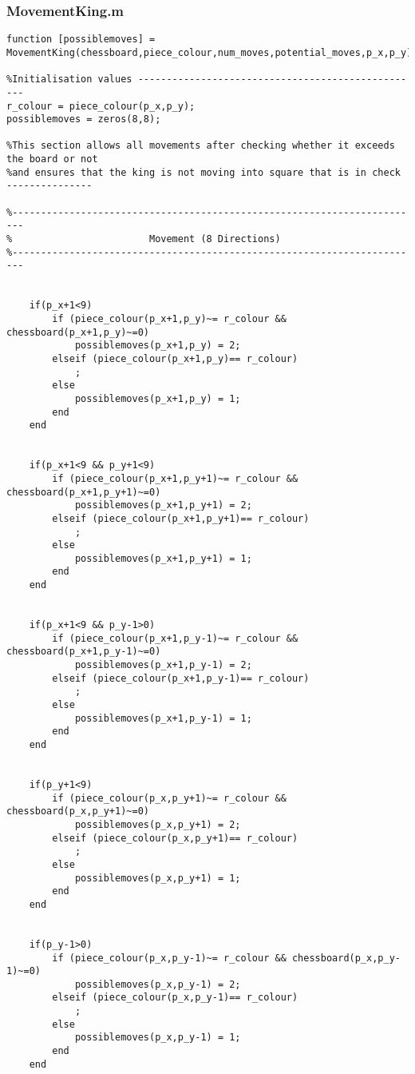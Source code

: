 \documentclass{article}
\begin{document}
\subsubsection{MovementKing.m}
\begin{lstlisting}
function [possiblemoves] = MovementKing(chessboard,piece_colour,num_moves,potential_moves,p_x,p_y)

%Initialisation values --------------------------------------------------
r_colour = piece_colour(p_x,p_y);
possiblemoves = zeros(8,8);

%This section allows all movements after checking whether it exceeds the board or not 
%and ensures that the king is not moving into square that is in check ---------------

%------------------------------------------------------------------------
%                        Movement (8 Directions)
%------------------------------------------------------------------------

    
    if(p_x+1<9)
        if (piece_colour(p_x+1,p_y)~= r_colour && chessboard(p_x+1,p_y)~=0)
            possiblemoves(p_x+1,p_y) = 2;
        elseif (piece_colour(p_x+1,p_y)== r_colour)
            ;
        else
            possiblemoves(p_x+1,p_y) = 1;
        end
    end
    
    
    if(p_x+1<9 && p_y+1<9)
        if (piece_colour(p_x+1,p_y+1)~= r_colour && chessboard(p_x+1,p_y+1)~=0)
            possiblemoves(p_x+1,p_y+1) = 2;
        elseif (piece_colour(p_x+1,p_y+1)== r_colour)
            ;
        else
            possiblemoves(p_x+1,p_y+1) = 1;
        end
    end
    
    
    if(p_x+1<9 && p_y-1>0)
        if (piece_colour(p_x+1,p_y-1)~= r_colour && chessboard(p_x+1,p_y-1)~=0)
            possiblemoves(p_x+1,p_y-1) = 2;
        elseif (piece_colour(p_x+1,p_y-1)== r_colour)
            ;
        else
            possiblemoves(p_x+1,p_y-1) = 1;
        end
    end
    
    
    if(p_y+1<9)
        if (piece_colour(p_x,p_y+1)~= r_colour && chessboard(p_x,p_y+1)~=0)
            possiblemoves(p_x,p_y+1) = 2;
        elseif (piece_colour(p_x,p_y+1)== r_colour)
            ;
        else
            possiblemoves(p_x,p_y+1) = 1;
        end
    end
    
    
    if(p_y-1>0)
        if (piece_colour(p_x,p_y-1)~= r_colour && chessboard(p_x,p_y-1)~=0)
            possiblemoves(p_x,p_y-1) = 2;
        elseif (piece_colour(p_x,p_y-1)== r_colour)
            ;
        else
            possiblemoves(p_x,p_y-1) = 1;
        end
    end
    

\end{lstlisting}
\end{document}
